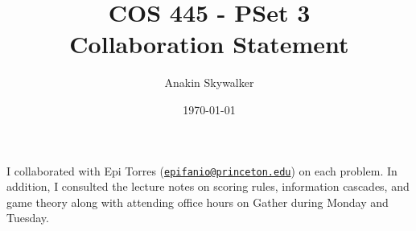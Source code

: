 \documentclass[12pt]{article}%
\begin{document}
\title{COS 445 - PSet 3 \\ Collaboration Statement} %
\author{Anakin Skywalker} %
\date{\today}
\maketitle

I collaborated with Epi Torres (\href{mailto:epifanio@princeton.edu}{\nolinkurl{epifanio@princeton.edu}}) on each problem. In addition, I consulted the lecture notes on scoring rules, information cascades, and game theory along with attending office hours on Gather during Monday and Tuesday.
\end{document}
